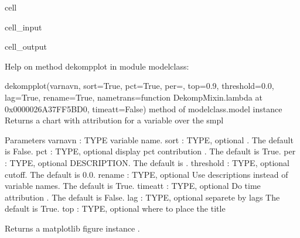 \documentclass[letterpaper,10pt,english]{jupyterBook}
\begin{document}
\begin{sphinxuseclass}{cell}\begin{sphinxVerbatimInput}

\begin{sphinxuseclass}{cell_input}
\begin{sphinxVerbatim}[commandchars=\\\{\}]
\end{sphinxVerbatim}

\end{sphinxuseclass}\end{sphinxVerbatimInput}
\begin{sphinxVerbatimOutput}

\begin{sphinxuseclass}{cell_output}
\begin{sphinxVerbatim}[commandchars=\\\{\}]
Help on method dekomp\PYGZus{}plot in module modelclass:

dekomp\PYGZus{}plot(varnavn, sort=True, pct=True, per=\PYGZsq{}\PYGZsq{}, top=0.9, threshold=0.0, lag=True, rename=True, nametrans=\PYGZlt{}function Dekomp\PYGZus{}Mixin.\PYGZlt{}lambda\PYGZgt{} at 0x0000026A37FF5BD0\PYGZgt{}, time\PYGZus{}att=False) method of modelclass.model instance
    Returns  a chart with attribution for a variable over the smpl  
    
    Parameters
    \PYGZhy{}\PYGZhy{}\PYGZhy{}\PYGZhy{}\PYGZhy{}\PYGZhy{}\PYGZhy{}\PYGZhy{}\PYGZhy{}\PYGZhy{}
    varnavn : TYPE
        variable name.
    sort : TYPE, optional
        . The default is False.
    pct : TYPE, optional
        display pct contribution . The default is True.
    per : TYPE, optional
        DESCRIPTION. The default is \PYGZsq{}\PYGZsq{}.
    threshold : TYPE, optional
        cutoff. The default is 0.0.
    rename : TYPE, optional
        Use descriptions instead of variable names. The default is True.
    time\PYGZus{}att : TYPE, optional
        Do time attribution . The default is False.
    lag : TYPE, optional
       separete by lags The default is True.           
    top : TYPE, optional
      where to place the title 
       
    
    Returns
    \PYGZhy{}\PYGZhy{}\PYGZhy{}\PYGZhy{}\PYGZhy{}\PYGZhy{}\PYGZhy{}
    a matplotlib figure instance .
\end{sphinxVerbatim}

\end{sphinxuseclass}\end{sphinxVerbatimOutput}

\end{sphinxuseclass}
\end{document}
